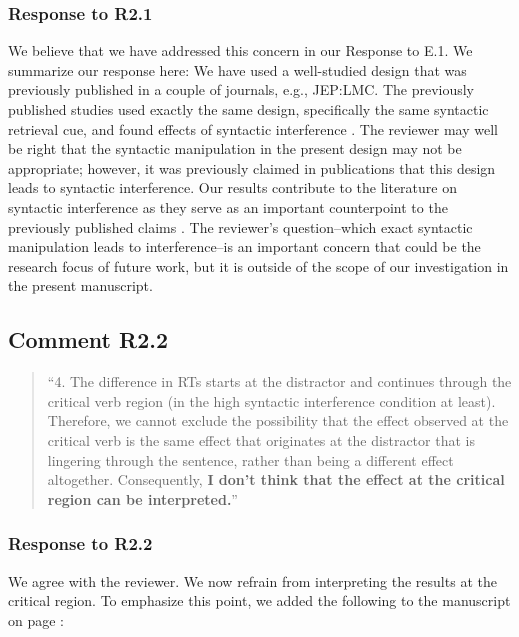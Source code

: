 \documentclass[12pt]{article}
\begin{document}
\subsubsection*{Response to R2.1}
We believe that we have addressed this concern in our Response to E.1. We summarize our response here: We have used a well-studied design that was previously published in a couple of journals, e.g., JEP:LMC. The previously published studies used exactly the same design, specifically the same syntactic retrieval cue, and found effects of syntactic interference \citep{vandyke07,mertzen}. The reviewer may well be right that the syntactic manipulation in the present design may not be appropriate; however, it was previously claimed in publications that this design leads to syntactic interference. Our results contribute to the literature on syntactic interference as they serve as an important counterpoint to the previously published claims \citep{vandyke07, mertzen}. The reviewer's question--which exact syntactic manipulation leads to interference--is an important concern that could be the research focus of future work, but it is outside of the scope of our investigation in the present manuscript. 


\subsection*{Comment R2.2}
\begin{quote}
``4. The difference in RTs starts at the distractor and continues through the critical verb region (in the high syntactic interference condition at least). Therefore, we cannot exclude the possibility that the effect observed at the critical verb is the same effect that originates at the distractor that is lingering through the sentence, rather than being a different effect altogether. Consequently, \textbf{I don't think that the effect at the critical region can be interpreted.}''
\end{quote}

\subsubsection*{Response to R2.2}
We agree with the reviewer. We now refrain from interpreting the results at the critical region. To emphasize this point, we added the following to the manuscript on page \pageref{only_precritical}:\\

\begin{quote}
\end{quote}
\end{document}

